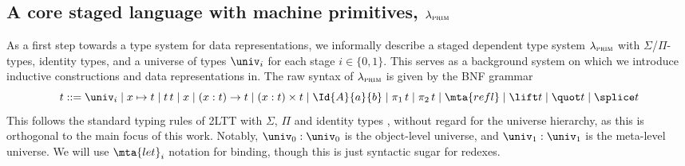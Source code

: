 \subsection{A core staged language with machine primitives, $\lambda_{\textsc{prim}}$}
\newcommand{\seq}[2]{[#1; #2]}

As a first step towards a type system for data representations, we informally
describe a staged dependent type system $\lambda_{\textsc{prim}}$ with
$\Sigma$/$\Pi$-types, identity types, and a universe of types $\univ_i$ for
each stage $i \in \{0, 1\}$. This serves as a background system on which we
introduce inductive constructions and data representations in. The raw syntax
of $\lambda_{\textsc{prim}}$ is given by the BNF grammar
\[
  t ::= \univ_i \mid x \mapsto t \mid t \, t \mid x \mid (x : t) \to t \mid (x : t) \times t \mid
  \Id{A}{a}{b} \mid \pi_1 \, t \mid \pi_2 \, t \mid \mta{refl} \mid \lift t \mid \quot t \mid \splice t
\]
This follows the standard typing rules of 2LTT with $\Sigma$, $\Pi$ and
identity types \cite{Kovacs2022-vb}, without regard for the universe hierarchy,
as this is orthogonal to the main focus of this work. Notably, $\univ_0 :
  \univ_0$ is the object-level universe, and $\univ_1 : \univ_1$ is the
meta-level universe. We will use $\mta{let}_i$ notation for binding, though
this is just syntactic sugar for redexes.

